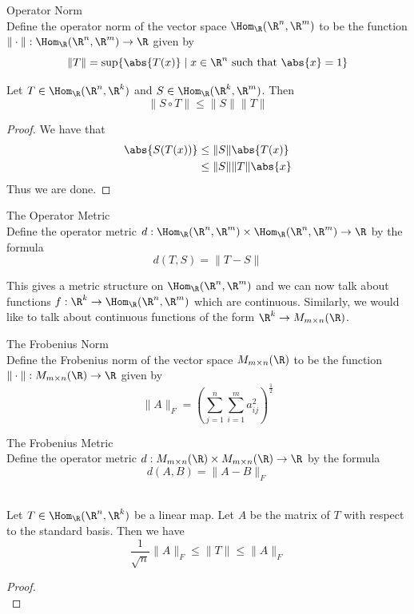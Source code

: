 \documentclass[a4paper]{article}
\begin{document}
\begin{defn}{Operator Norm}{}\\
Define the operator norm of the vector space $\Hom_\R(\R^n,\R^m)$ to be the function $\|\cdot\|:\Hom_\R(\R^n,\R^m)\to\R$ given by $$\|T\|=\sup\{\abs{T(x)}\;|\;x\in\R^n\text{ such that }\abs{x}=1\}$$
\end{defn}

\begin{lmm}{}{} Let $T\in\Hom_\R(\R^n,\R^k)$ and $S\in\Hom_\R(\R^k,\R^m)$. Then $$\|S\circ T\|\leq\|S\|\|T\|$$ 
\begin{proof}
We have that 
\begin{align*}
\abs{S(T(x))}&\leq\|S\|\abs{T(x)}\\
&\leq\|S\|\|T\|\abs{x}
\end{align*}
Thus we are done. 
\end{proof}
\end{lmm}

\begin{defn}{The Operator Metric}{}\\
Define the operator metric $d:\Hom_\R(\R^n,\R^m)\times\Hom_\R(\R^n,\R^m)\to\R$ by the formula $$d(T,S)=\|T-S\|$$
\end{defn}

This gives a metric structure on $\Hom_\R(\R^n,\R^m)$ and we can now talk about functions $f:\R^k\to\Hom_\R(\R^n,\R^m)$ which are continuous. Similarly, we would like to talk about continuous functions of the form $\R^k\to M_{m\times n}(\R)$. 

\begin{defn}{The Frobenius Norm}{}\\
Define the Frobenius norm of the vector space $M_{m\times n}(\R)$ to be the function $\|\cdot\|:M_{m\times n}(\R)\to\R$ given by $$\|A\|_F=\left(\sum_{j=1}^n\sum_{i=1}^ma_{ij}^2\right)^{\frac{1}{2}}$$
\end{defn}

\begin{defn}{The Frobenius Metric}{}\\
Define the operator metric $d:M_{m\times n}(\R)\times M_{m\times n}(\R)\to\R$ by the formula $$d(A,B)=\|A-B\|_F$$
\end{defn}

\begin{lmm}{}{}\\
Let $T\in\Hom_\R(\R^n,\R^k)$ be a linear map. Let $A$ be the matrix of $T$ with respect to the standard basis. Then we have $$\frac{1}{\sqrt{n}}\|A\|_F\leq\|T\|\leq\|A\|_F$$
\begin{proof}\\
\end{proof}
\end{lmm}
\end{document}
